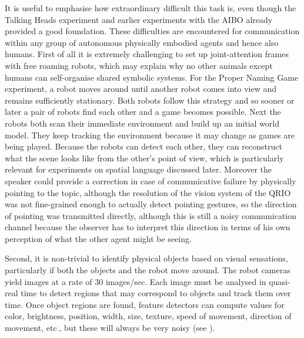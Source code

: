 It is useful to emphasise how extraordinary difficult this task is, even though the Talking Heads experiment and 
earlier experiments with the AIBO already 
provided a good foundation. These difficulties are encountered for communication within any group of
autonomous physically embodied agents and hence also humans. 
First of all it is extremely challenging to set up joint-attention frames with free roaming
robots, which may explain why no other animals except humans can self-organise
shared symbolic systems. For the Proper Naming Game experiment, a robot moves around until another robot comes into 
view and remains sufficiently 
stationary. Both robots follow this strategy and so sooner or later a pair of robots find each other
and a game becomes possible. Next the robots both scan their immediate environment and build up an initial world model. 
They keep tracking the environment because it may change as games are being played. 
Because the robots can detect each other, they can reconstruct what the scene looks like from the other's point of 
view, which is particularly relevant for experiments on spatial language discussed later. 
Moreover the speaker could provide a correction in case of 
communicative failure by physically pointing to the topic, although the resolution of the vision system of the QRIO was not 
fine-grained enough to actually detect pointing gestures, so the direction of pointing was transmitted directly, although
this is still a noisy communication channel because the observer has to interpret this direction in terms of his own 
perception of what the other agent might be seeing. 

Second, it is non-trivial to identify physical objects based on visual sensations,
particularly if both the objects and the robot move around. The robot
cameras yield images at a rate of 30 images/sec. Each image must be
analysed in quasi-real time to detect regions that may correspond to objects
and track them over time. Once object regions are found, feature detectors can compute values for color,
brightness, position, width, size, texture, speed of movement,
direction of movement, etc., but these will always be very noisy (see ). 

